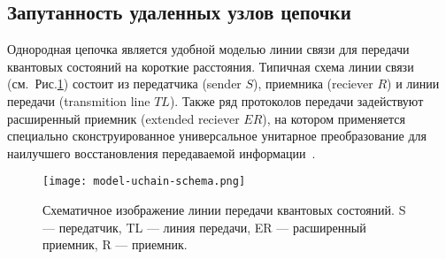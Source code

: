 \subsection{Запутанность удаленных узлов цепочки}
\label{subsec:entanglement-of-remote-chain-nodes}
Однородная цепочка является удобной моделью линии связи для передачи квантовых состояний на короткие расстояния.
Типичная схема линии связи (см.~Рис.\ref{fig:model-uchain-schema}) состоит из передатчика (sender $S$),
приемника (reciever $R$)
и линии передачи (transmition line $TL$).
Также ряд протоколов передачи задействуют расширенный приемник (extended reciever $ER$),
на котором применяется специально сконструированное универсальное унитарное преобразование для наилучшего восстановления передаваемой информации~\cite{Feldman2021}.

\begin{figure}[H]
  \centering
  \texttt{[image: model-uchain-schema.png]}
  \caption{
    Схематичное изображение линии передачи квантовых состояний.
    S --- передатчик,
    TL --- линия передачи,
    ER --- расширенный приемник,
    R --- приемник.
  }
  \label{fig:model-uchain-schema}
\end{figure}

